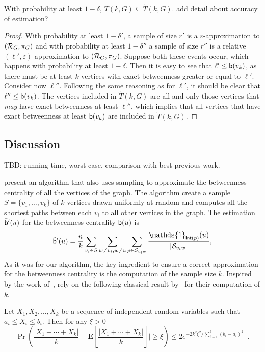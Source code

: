 \begin{lemma}
  With probability at least $1-\delta$, $T(k,G)\subseteq \tilde T(k,G)$.
  \XXX add detail about accuracy of estimation?
\end{lemma}
\begin{proof}
  With probability at least $1-\delta'$, a sample of size $r'$ is a
  $\varepsilon$-approximation to $(\mathcal{R}_G,\pi_G)$ and with probability at least
  $1-\delta''$ a sample of size $r''$ is a relative
  $(\ell',\varepsilon)$-approximation to $(\mathcal{R}_G,\pi_G)$. Suppose both these events
  occur, which happens with probability at least $1-\delta$.
  Then it is easy to see that $\ell'\le\mathsf{b}(v_k)$, as there must be at least
  $k$ vertices with exact betweenness greater or equal to $\ell'$. 
  Consider now $\ell''$. Following the same reasoning as for $\ell'$, it should
  be clear that $\ell''\le\mathsf{b}(v_k)$. The vertices included in $\tilde T(k,G)$
  are all and only those vertices that \emph{may} have exact betweenness at least
  $\ell''$, which implies that all vertices that have exact betweenness at least
  $\mathsf{b}(v_k)$ are included in $\tilde T(k,G)$. 
\end{proof}

\subsection{Discussion}\label{sec:discussion}
\XXX TBD: running time, worst case, comparison with best previous work.

\citet{BrandesP07} present an algorithm that also uses sampling to approximate
the betweenness centrality of all the vertices of the graph. The algorithm
create a sample $S=\{v_1,\dotsc,v_k\}$ of $k$ vertices drawn uniformly at random 
and computes all the shortest paths between each $v_i$ to all other vertices in
the graph. The estimation $\tilde{\mathsf{b}}'(u)$ for the betweenness centrality
$\mathsf{b}(u)$ is
\[ 
\tilde\betw'(u)= \frac{n}{k}\sum_{v_i\in S}\sum_{w\neq v_i,w\neq
u}\sum_{p\in\mathcal{S}_{v_iw}}\frac{\mathds{1}_{\mathsf{Int}(p)}(u)}{|\mathcal{S}_{v_iw}|},
\]
As it was for our algorithm, the key ingredient to ensure a correct
approximation for the betweenness centrality is the computation of the sample
size $k$. Inspired by the work of~\citet{EppsteinW04}, \citet{BrandesP07} rely
on the following classical result by~\citet{Hoeffding63} for their computation
of $k$.

\begin{theorem}
  Let $X_1,X_2,\dotsc,X_k$ be a sequence of independent random variables
  such that $a_i\leq X_i\leq b_i$. Then for any $\xi > 0$
  \begin{equation}\label{eq:hoeffding}
    \Pr\left(\frac{|X_1+\dotsb+X_k|}{k}-\mathbf{E}\left[\frac{|X_1+\dotsb+X_k|}{k}\right]|\geq
    \xi\right)\leq 2e^{-2k^2\xi^2/\sum_{i=1}^{k}(b_{i}-a_{i})^2}\enspace.
  \end{equation}
\end{theorem}

